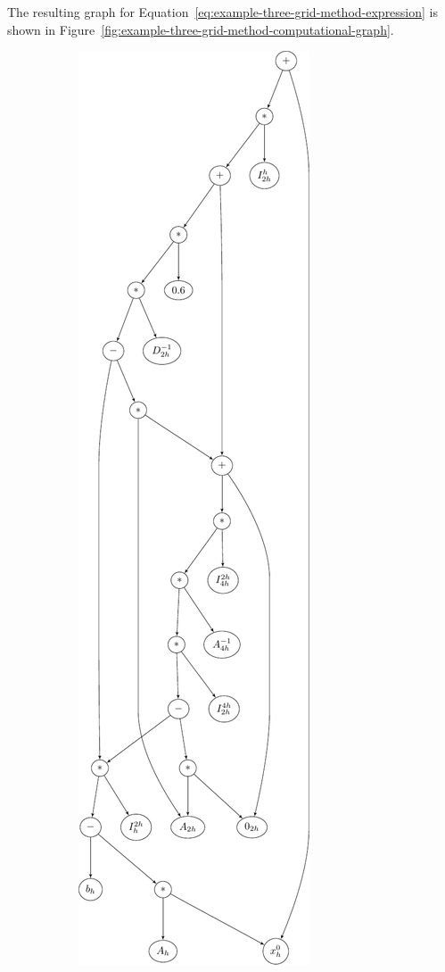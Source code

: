 The resulting graph for Equation~\eqref{eq:example-three-grid-method-expression} is shown in Figure~\ref{fig:example-three-grid-method-computational-graph}.
\begin{figure}
	\centering
	\begin{subfigure}[b]{0.49\textwidth}
		\includegraphics[scale=0.5]{figures/trees/three_grid_method_computational_graph.pdf}

\end{subfigure}
\end{figure}
